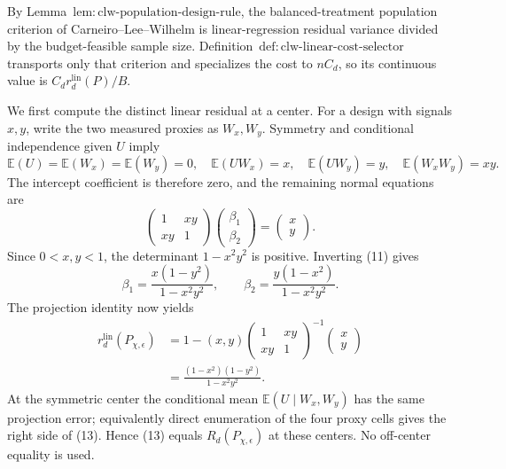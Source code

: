 By Lemma~\(\mathrm{lem{:}clw\text{-}population\text{-}design\text{-}rule}\), the balanced-treatment population criterion of Carneiro--Lee--Wilhelm is linear-regression residual variance divided by the budget-feasible sample size.  Definition~\(\mathrm{def{:}clw\text{-}linear\text{-}cost\text{-}selector}\) transports only that criterion and specializes the cost to \(nC_d\), so its continuous value is \(C_dr_d^{\mathrm{lin}}(P)/B\).

We first compute the distinct linear residual at a center.  For a design with signals \(x,y\), write the two measured proxies as \(W_x,W_y\).  Symmetry and conditional independence given \(U\) imply
\[
 \mathbb E(U)=\mathbb E(W_x)=\mathbb E(W_y)=0,
 \quad
 \mathbb E(UW_x)=x,
 \quad
 \mathbb E(UW_y)=y,
 \quad
 \mathbb E(W_xW_y)=xy.                                   \tag{10}
\]
The intercept coefficient is therefore zero, and the remaining normal equations are
\[
 \begin{pmatrix}1&xy\\xy&1\end{pmatrix}
 \begin{pmatrix}\beta_1\\\beta_2\end{pmatrix}
 =\begin{pmatrix}x\\y\end{pmatrix}.                     \tag{11}
\]
Since \(0<x,y<1\), the determinant \(1-x^2y^2\) is positive.  Inverting (11) gives
\[
 \beta_1=\frac{x(1-y^2)}{1-x^2y^2},
 \qquad
 \beta_2=\frac{y(1-x^2)}{1-x^2y^2}.                       \tag{12}
\]
The projection identity now yields
\[
 \begin{aligned}
 r_d^{\mathrm{lin}}(P_{\chi,\epsilon})
 &=1-(x,y)
 \begin{pmatrix}1&xy\\xy&1\end{pmatrix}^{-1}
 \begin{pmatrix}x\\y\end{pmatrix}\\
 &=\frac{(1-x^2)(1-y^2)}{1-x^2y^2}.                       \tag{13}
 \end{aligned}
\]
At the symmetric center the conditional mean \(\mathbb E(U\mid W_x,W_y)\) has the same projection error; equivalently direct enumeration of the four proxy cells gives the right side of (13).  Hence (13) equals \(R_d(P_{\chi,\epsilon})\) at these centers.  No off-center equality is used.

